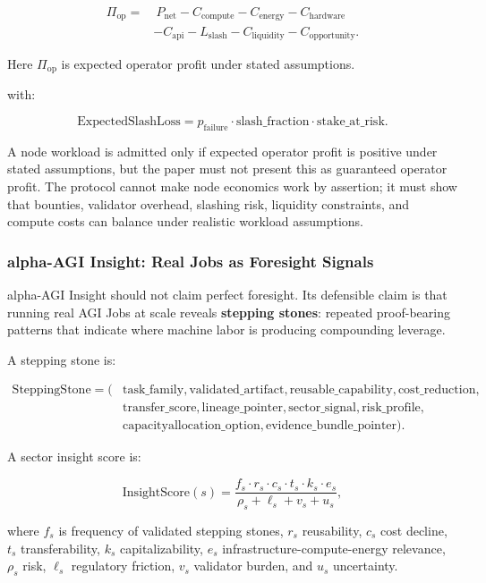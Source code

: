 \[
\begin{aligned}
\Pi_{\mathrm{op}}=&\ P_{\mathrm{net}}
-C_{\mathrm{compute}}
-C_{\mathrm{energy}}
-C_{\mathrm{hardware}}\\
&-C_{\mathrm{api}}
-L_{\mathrm{slash}}
-C_{\mathrm{liquidity}}
-C_{\mathrm{opportunity}}.
\end{aligned}
\]

Here \(\Pi_{\mathrm{op}}\) is expected operator profit under stated
assumptions.

with:

\[
\mathrm{ExpectedSlashLoss}
=
p_{\mathrm{failure}}\cdot
\mathrm{slash\_fraction}\cdot
\mathrm{stake\_at\_risk}.
\]

A node workload is admitted only if expected operator profit is positive
under stated assumptions, but the paper must not present this as
guaranteed operator profit. The protocol cannot make node economics work
by assertion; it must show that bounties, validator overhead, slashing
risk, liquidity constraints, and compute costs can balance under
realistic workload assumptions.

\subsubsection{alpha-AGI Insight: Real Jobs as Foresight
Signals}\label{alpha-agi-insight-real-jobs-as-foresight-signals}

alpha-AGI Insight should not claim perfect foresight. Its defensible
claim is that running real AGI Jobs at scale reveals \textbf{stepping
stones}: repeated proof-bearing patterns that indicate where machine
labor is producing compounding leverage.

A stepping stone is:

\[
\begin{aligned}
\mathrm{SteppingStone}=(&\mathrm{task\_family}, \mathrm{validated\_artifact},
\mathrm{reusable\_capability}, \mathrm{cost\_reduction},\\
&\mathrm{transfer\_score}, \mathrm{lineage\_pointer},
\mathrm{sector\_signal}, \mathrm{risk\_profile},\\
&\mathrm{capacity allocation\_option}, \mathrm{evidence\_bundle\_pointer}).
\end{aligned}
\]

A sector insight score is:

\[
\mathrm{InsightScore}(s)
=
\frac{
f_s\cdot r_s\cdot c_s\cdot t_s\cdot k_s\cdot e_s
}{
\rho_s+\ell_s+v_s+u_s
},
\]

where \(f_s\) is frequency of validated stepping stones, \(r_s\)
reusability, \(c_s\) cost decline, \(t_s\) transferability, \(k_s\)
capitalizability, \(e_s\) infrastructure-compute-energy relevance,
\(\rho_s\) risk, \(\ell_s\) regulatory friction, \(v_s\) validator
burden, and \(u_s\) uncertainty.

